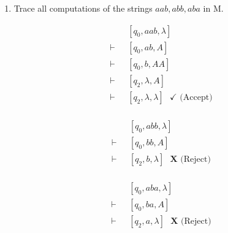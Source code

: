 \documentclass[12pt]{article}
\begin{document}
\begin{enumerate}
\begin{enumerate}
\begin{center}
    \end{center}
  \item Trace all computations of the strings $aab, abb, aba$ in M.\\
    \begin{minipage}[t]{0.25\textwidth}
        \begin{align*}
          &\text{ }[q_0,aab,\lambda] \\
          \vdash &\text{ }[q_0,ab,A] \\
          \vdash &\text{ }[q_0,b, AA] \\
          \vdash &\text{ }[q_2,\lambda,A] \\
          \vdash &\text{ }[q_2,\lambda,\lambda] \text{ } \checkmark \text{ (Accept)} \\
        \end{align*}
      \end{minipage}
    \begin{minipage}[t]{0.25\textwidth}
        \begin{align*}
          &\text{ }[q_0,abb,\lambda] \\
          \vdash &\text{ }[q_0,bb,A] \\
          \vdash &\text{ }[q_2,b,\lambda] \text{ } \textbf{X} \text{ (Reject)} \\
        \end{align*}
      \end{minipage}
      \begin{minipage}[t]{0.25\textwidth}
        \begin{align*}
          &\text{ }[q_0,aba,\lambda] \\
          \vdash &\text{ }[q_0,ba,A] \\
          \vdash &\text{ }[q_2,a, \lambda] \text{ } \textbf{X} \text{ (Reject)}\\
        \end{align*}
      \end{minipage}
      

\end{enumerate}
\end{enumerate}
\end{document}

